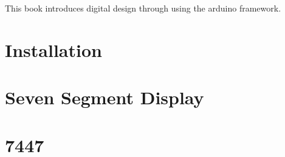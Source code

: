 \documentclass[11pt]{book}
\begin{document}

\setcounter{page}{1}

\begin{introduction}
This book introduces digital design through using the arduino framework.

\end{introduction}

\mainmatter
\chapter{Installation}

\chapter{Seven Segment Display}

\chapter{7447}

\end{document}

